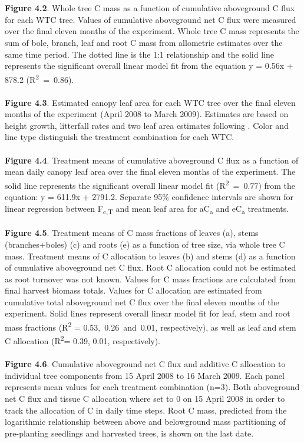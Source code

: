 \documentclass[a4paper]{article}
\begin{document}
\\
\\
\textbf{Figure 4.2}. Whole tree C mass as a function of cumulative aboveground C flux for each WTC tree. Values of cumulative aboveground net C flux were measured over the final eleven months of the experiment. Whole tree C mass represents the sum of bole, branch, leaf and root C mass from allometric estimates over the same time period. The dotted line is the 1:1 relationship and the solid line represents the significant overall linear model fit from the equation y = 0.56x + 878.2 (R\textsuperscript{2}~=~0.86).
\\
\\
\textbf{Figure 4.3}. Estimated canopy leaf area for each WTC tree over the final eleven months of the experiment (April 2008 to March 2009). Estimates are based on height growth, litterfall rates and two leaf area estimates following \citet{barton2012effects}. Color and line type distinguish the treatment combination for each WTC.
\\
\\
\textbf{Figure 4.4}. Treatment means of cumulative aboveground C flux as a function of mean daily canopy leaf area over the final eleven months of the experiment. The solid line represents the significant overall linear model fit (R\textsuperscript{2}~=~0.77) from the equation: y = 611.9x + 2791.2. Separate 95\% confidence intervals are shown for linear regression between F\textsubscript{c,T} and mean leaf area for aC\textsubscript{a} and eC\textsubscript{a} treatments.
\\
\\
\textbf{Figure 4.5}. Treatment means of C mass fractions of leaves (a), stems (branches+boles) (c) and roots (e) as a function of tree size, via whole tree C mass. Treatment means of C allocation to leaves (b) and stems (d) as a function of cumulative aboveground net C flux. Root C allocation could not be estimated as root turnover was not known. Values for C mass fractions are calculated from final harvest biomass totals. Values for C allocation are estimated from cumulative total aboveground net C flux over the final eleven months of the experiment. Solid lines represent overall linear model fit for leaf, stem and root mass fractions (R\textsuperscript{2} = 0.53,~0.26~and~0.01, respectively), as well as leaf and stem C allocation (R\textsuperscript{2}= 0.39, 0.01, respectively).
\\
\\
\textbf{Figure 4.6}. Cumulative aboveground net C flux and additive C allocation to individual tree components from 15 April 2008 to 16 March 2009. Each panel represents mean values for each treatment combination (n=3). Both aboveground net C flux and tissue C allocation where set to 0 on 15 April 2008 in order to track the allocation of C in daily time steps. Root C mass, predicted from the logarithmic relationship between above and belowground mass partitioning of pre-planting seedlings and harvested trees, is shown on the last date.
\end{document}
